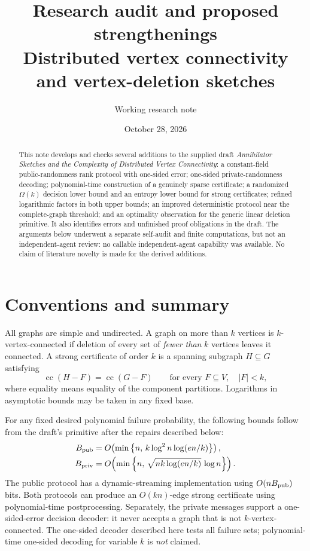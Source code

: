 \documentclass[11pt]{article}
\title{Research audit and proposed strengthenings\\\large Distributed vertex connectivity and vertex-deletion sketches}
\author{Working research note}
\date{October 28, 2026}
\theoremstyle{remark}\newtheorem{remark}[theorem]{Remark}
\newcommand{\cc}{\operatorname{cc}}
\begin{document}
\maketitle
\begin{abstract}
This note develops and checks several additions to the supplied draft \emph{Annihilator Sketches and the Complexity of Distributed Vertex Connectivity}: a constant-field public-randomness rank protocol with one-sided error; one-sided private-randomness decoding; polynomial-time construction of a genuinely sparse certificate; a randomized $\Omega(k)$ decision lower bound and an entropy lower bound for strong certificates; refined logarithmic factors in both upper bounds; an improved deterministic protocol near the complete-graph threshold; and an optimality observation for the generic linear deletion primitive. It also identifies errors and unfinished proof obligations in the draft. The arguments below underwent a separate self-audit and finite computations, but not an independent-agent review: no callable independent-agent capability was available. No claim of literature novelty is made for the derived additions.
\end{abstract}

\section{Conventions and summary}
All graphs are simple and undirected. A graph on more than $k$ vertices is $k$-vertex-connected if deletion of every set of \emph{fewer than} $k$ vertices leaves it connected. A strong certificate of order $k$ is a spanning subgraph $H\subseteq G$ satisfying
\[
 \cc(H-F)=\cc(G-F)\qquad\text{for every }F\subseteq V,\quad |F|<k,
\]
where equality means equality of the component partitions. Logarithms in asymptotic bounds may be taken in any fixed base.

For any fixed desired polynomial failure probability, the following bounds follow from the draft's primitive after the repairs described below:
\begin{align*}
 B_{\rm pub}&=O\!\left(\min\left\{n,\,k\log^2 n\log(en/k)\right\}\right),\\
 B_{\rm priv}&=O\!\left(\min\left\{n,\,\sqrt{nk\log(en/k)}\,\log n\right\}\right).
\end{align*}
The public protocol has a dynamic-streaming implementation using $O(nB_{\rm pub})$ bits. Both protocols can produce an $O(kn)$-edge strong certificate using polynomial-time postprocessing. Separately, the private messages support a one-sided-error decision decoder: it never accepts a graph that is not $k$-vertex-connected. The one-sided decoder described here tests all failure sets; polynomial-time one-sided decoding for variable $k$ is \emph{not} claimed.
\end{document}
